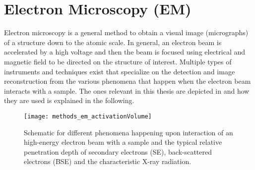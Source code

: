 \documentclass[\main/dresen_thesis.tex]{subfiles}
\begin{document}
  \section{Electron Microscopy (EM)}
    \label{ch:methods:em}
    Electron microscopy is a general method to obtain a visual image (micrographs) of a structure down to the atomic scale.
    In general, an electron beam is accelerated by a high voltage and then the beam is focused using electrical and magnetic field to be directed on the structure of interest.
    Multiple types of instruments and techniques exist that specialize on the detection and image reconstruction from the various phenomena that happen when the electron beam interacts with a sample.
    The ones relevant in this thesis are depicted in  and how they are used is explained in the following.

    \begin{figure}[tb]
      \centering
      \texttt{[image: methods\_em\_activationVolume]}
      \caption{\label{fig:methods:em:activationVolume}Schematic for different phenomena happening upon interaction of an high-energy electron beam with a sample and the typical relative penetration depth of secondary electrons (SE), back-scattered electrons (BSE) and the characteristic X-ray radiation.}
    \end{figure}
\end{document}
